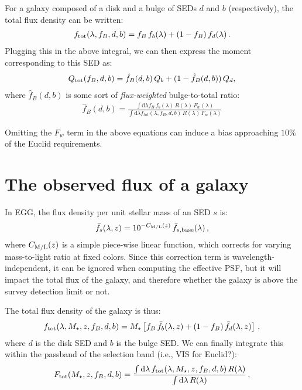 \documentclass[11pt,a4paper]{article}
\newcommand{\mstar}{M_\star}
\newcommand{\uvj}{\text{\it UVJ}\xspace}
\newcommand{\dd}{\mathrm{d}}
\numberwithin{equation}{section}
\begin{document}
For a galaxy composed of a disk and a bulge of SEDs $d$ and $b$ (respectively), the total flux density can be written:
\begin{align}
f_{\rm tot}(\lambda, f_B, d, b) = f_B\,f_b(\lambda) + (1-f_B)\,f_d(\lambda)\,.
\end{align}
Plugging this in the above integral, we can then express the moment corresponding to this SED as:
\begin{align}
Q_{\rm tot}(f_B, d, b) = \hat{f}_B(d,b)\,Q_b + (1 - \hat{f}_B(d,b))\,Q_d,
\end{align}
where $\hat{f}_B(d,b)$ is some sort of \emph{flux-weighted} bulge-to-total ratio:
\begin{align}
\hat{f}_B(d,b) = \frac{\int \dd\lambda f_B\,f_b(\lambda)\,R(\lambda)\,F_w(\lambda)}{\int \dd\lambda f_{tot}(\lambda, f_B, d, b)\,R(\lambda)\,F_w(\lambda)}
\end{align}

Omitting the $F_w$ term in the above equations can induce a bias approaching $10\%$ of the Euclid requirements.

\section{The observed flux of a galaxy}

In EGG, the flux density per unit stellar mass of an SED $s$ is:
\begin{align}
\bar{f}_s(\lambda, z) = 10^{-C_{\rm M/L}(z)}\,\bar{f}_{s,{\rm base}}(\lambda)\,,
\end{align}
where $C_{\rm M/L}(z)$ is a simple piece-wise linear function, which corrects for varying mass-to-light ratio at fixed \uvj colors. Since this correction term is wavelength-independent, it can be ignored when computing the effective PSF, but it will impact the total flux of the galaxy, and therefore whether the galaxy is above the survey detection limit or not.

The total flux density of the galaxy is thus:
\begin{align}
f_{\rm tot}(\lambda, \mstar, z, f_B, d, b) = \mstar\left[f_B\,\bar{f}_b(\lambda, z) + (1-f_B)\,\bar{f}_d(\lambda, z)\right]\,,
\end{align}
where $d$ is the disk SED and $b$ is the bulge SED. We can finally integrate this within the passband of the selection band (i.e., VIS for Euclid?):
\begin{align}
F_{\rm tot}(\mstar, z, f_B, d, b) = \frac{\int \dd\lambda\,f_{\rm tot}(\lambda, \mstar, z, f_B, d, b)\,R(\lambda)}{\int \dd\lambda\,R(\lambda)}\,,
\end{align}
\end{document}

